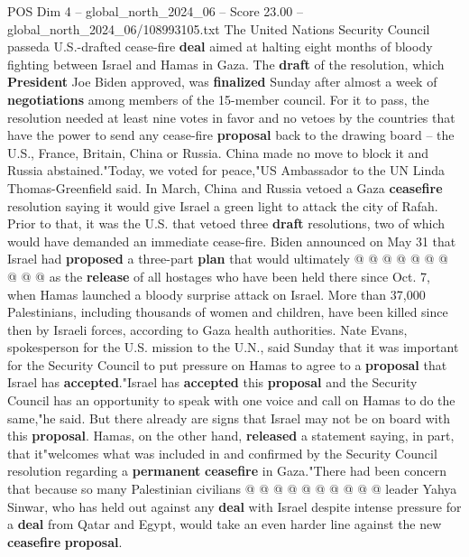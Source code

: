 \begin{textsample}{POS Dim 4 – global\_north\_2024\_06 – Score 23.00 – global\_north\_2024\_06/108993105.txt}  \label{ex:f4_pos_148}
The United Nations Security Council passeda U.S.-drafted cease-fire \textbf{deal} aimed at halting eight months of bloody fighting between Israel and Hamas in Gaza.
The \textbf{draft} of the resolution, which \textbf{President} Joe Biden approved, was \textbf{finalized} Sunday after almost a week of \textbf{negotiations} among members of the 15-member council.
For it to pass, the resolution needed at least nine votes in favor and no vetoes by the countries that have the power to send any cease-fire \textbf{proposal} back to the drawing board -- the U.S., France, Britain, China or Russia.
China made no move to block it and Russia abstained."Today, we voted for peace,"US Ambassador to the UN Linda Thomas-Greenfield said.
In March, China and Russia vetoed a Gaza \textbf{ceasefire} resolution saying it would give Israel a green light to attack the city of Rafah.
Prior to that, it was the U.S. that vetoed three \textbf{draft} resolutions, two of which would have demanded an immediate cease-fire.
Biden announced on May 31 that Israel had \textbf{proposed} a three-part \textbf{plan} that would ultimately @ @ @ @ @ @ @ @ @ @ as the \textbf{release} of all hostages who have been held there since Oct. 7, when Hamas launched a bloody surprise attack on Israel.
More than 37,000 Palestinians, including thousands of women and children, have been killed since then by Israeli forces, according to Gaza health authorities.
Nate Evans, spokesperson for the U.S. mission to the U.N., said Sunday that it was important for the Security Council to put pressure on Hamas to agree to a \textbf{proposal} that Israel has \textbf{accepted}."Israel has \textbf{accepted} this \textbf{proposal} and the Security Council has an opportunity to speak with one voice and call on Hamas to do the same,"he said.
But there already are signs that Israel may not be on board with this \textbf{proposal}.
Hamas, on the other hand, \textbf{released} a statement saying, in part, that it"welcomes what was included in and confirmed by the Security Council resolution regarding a \textbf{permanent} \textbf{ceasefire} in Gaza."There had been concern that because so many Palestinian civilians @ @ @ @ @ @ @ @ @ @ leader Yahya Sinwar, who has held out against any \textbf{deal} with Israel despite intense pressure for a \textbf{deal} from Qatar and Egypt, would take an even harder line against the new \textbf{ceasefire} \textbf{proposal}.

\end{textsample}
